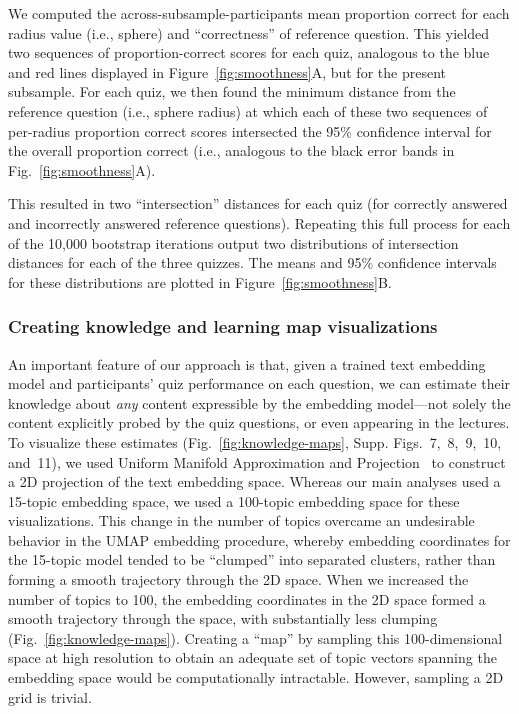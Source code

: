 \documentclass[10pt]{article}
\newcommand{\individualKnowledgeMapsA}{7}
\newcommand{\individualKnowledgeMapsB}{8}
\newcommand{\individualKnowledgeMapsC}{9}
\newcommand{\individualLearningMapsA}{10}
\newcommand{\individualLearningMapsB}{11}
\begin{document}
We computed the across-subsample-participants mean proportion correct for each
radius value (i.e., sphere) and ``correctness'' of reference question. This
yielded two sequences of proportion-correct scores for each quiz, analogous to
the blue and red lines displayed in Figure~\ref{fig:smoothness}A, but for the
present subsample. For each quiz, we then found the minimum distance from the
reference question (i.e., sphere radius) at which each of these two sequences
of per-radius proportion correct scores intersected the 95\% confidence
interval for the overall proportion correct (i.e., analogous to the black error
bands in Fig.~\ref{fig:smoothness}A).

This resulted in two ``intersection'' distances for each quiz (for correctly
answered and incorrectly answered reference questions). Repeating this full
process for each of the 10,000 bootstrap iterations output two distributions of
intersection distances for each of the three quizzes. The means and 95\%
confidence intervals for these distributions are plotted in
Figure~\ref{fig:smoothness}B.

\subsubsection*{Creating knowledge and learning map visualizations}\label{subsec:knowledge-maps}

An important feature of our approach is that, given a trained text embedding
model and participants' quiz performance on each question, we can estimate
their knowledge about \textit{any} content expressible by the embedding
model---not solely the content explicitly probed by the quiz questions, or even
appearing in the lectures. To visualize these estimates
(Fig.~\ref{fig:knowledge-maps}, Supp.
Figs.~\individualKnowledgeMapsA,~\individualKnowledgeMapsB,~\individualKnowledgeMapsC,~\individualLearningMapsA,
and~\individualLearningMapsB), we used Uniform Manifold Approximation and
Projection~\citep[UMAP; ][]{McInEtal18a, McInEtal18b} to construct a 2D
projection of the text embedding space. Whereas our main analyses used a
15-topic embedding space, we used a 100-topic embedding space for these
visualizations. This change in the number of topics overcame an undesirable
behavior in the UMAP embedding procedure, whereby embedding coordinates for the
15-topic model tended to be ``clumped'' into separated clusters, rather than
forming a smooth trajectory through the 2D space. When we increased the number
of topics to 100, the embedding coordinates in the 2D space formed a smooth
trajectory through the space, with substantially less clumping
(Fig.~\ref{fig:knowledge-maps}). Creating a ``map'' by sampling this
100-dimensional space at high resolution to obtain an adequate set of topic
vectors spanning the embedding space would be computationally intractable.
However, sampling a 2D grid is trivial.
\end{document}
